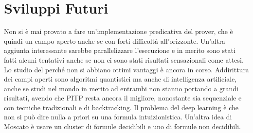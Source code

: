 \documentclass[a4paper,12pt, oneside]{book}
\begin{document}
\section{Sviluppi Futuri}
Non si è mai provato a fare un'implementazione predicativa del prover,
che è quindi un campo aperto anche se con forti difficoltà all'orizzonte.
Un'altra aggiunta interessante sarebbe parallelizzare l'esecuzione e in merito
sono stati fatti alcuni tentativi anche se non ci sono stati risultati
sensazionali come attesi. Lo studio del perché non si abbiano ottimi vantaggi è
ancora in corso.
Addirittura dei campi aperti sono algoritmi quantistici ma anche di
intelligenza artificiale, anche se studi nel mondo in merito ad entrambi non
stanno portando a grandi risultati, avendo che PITP resta ancora il migliore,
nonostante sia sequenziale e con tecniche tradizionali e di backtracking. Il
problema del deep learning è che non si può dire nulla a priori su una formula
intuizionistica. 
Un'altra idea di Moscato è usare un cluster di formule decidibili e uno di
formule non decidibili.
\end{document}
